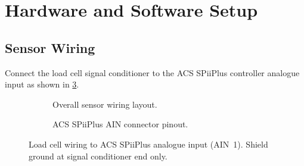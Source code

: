 
\section{Hardware and Software Setup}
\label{sec:setup}


\subsection{Sensor Wiring}
\label{sec:setup:wiring}

Connect the load cell signal conditioner to the ACS SPiiPlus controller
analogue input as shown in \cref{fig:wiring-diagram}.

\begin{figure}[H]
  \centering
  \begin{subfigure}[b]{0.48\textwidth}
    \fbox{\parbox{\textwidth}{\centering\vspace{24mm}
      \textcolor{PBAGray}{[PHOTO: Sensor wiring overview]}\vspace{24mm}}}
    \caption{Overall sensor wiring layout.}
    \label{fig:wiring-overview}
  \end{subfigure}
  \hfill
  \begin{subfigure}[b]{0.48\textwidth}
    \fbox{\parbox{\textwidth}{\centering\vspace{24mm}
      \textcolor{PBAGray}{[PHOTO: AIN connector pinout]}\vspace{24mm}}}
    \caption{ACS SPiiPlus AIN connector pinout.}
    \label{fig:ain-pinout}
  \end{subfigure}
  \caption{Load cell wiring to ACS SPiiPlus analogue input (AIN~1).
           Shield ground at signal conditioner end only.}
  \label{fig:wiring-diagram}
\end{figure}

